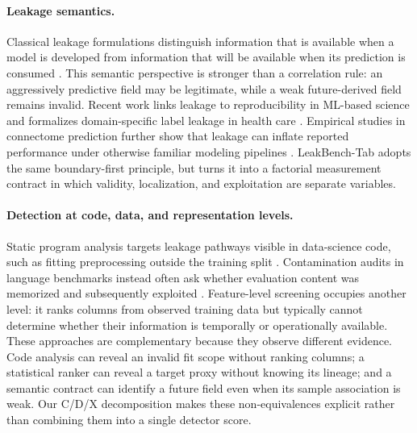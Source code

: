 \documentclass[sigconf,review]{acmart}
\begin{document}
\paragraph{Leakage semantics.}
Classical leakage formulations distinguish information that is available when
a model is developed from information that will be available when its
prediction is consumed \cite{kaufman2011leakage}. This semantic perspective is
stronger than a correlation rule: an aggressively predictive field may be
legitimate, while a weak future-derived field remains invalid. Recent work
links leakage to reproducibility in ML-based science \cite{kapoor2023leakage}
and formalizes domain-specific label leakage in health care
\cite{davis2024framework}. Empirical studies in connectome
prediction further show that leakage can inflate reported performance under
otherwise familiar modeling pipelines \cite{rosenblatt2024connectome}.
LeakBench-Tab adopts the same boundary-first principle, but turns it into a
factorial measurement contract in which validity, localization, and
exploitation are separate variables.

\paragraph{Detection at code, data, and representation levels.}
Static program analysis targets leakage pathways visible in data-science code,
such as fitting preprocessing outside the training split
\cite{subotic2022static}. Contamination audits in language benchmarks instead
often ask whether evaluation content was memorized and subsequently exploited
\cite{magar2022contamination}. Feature-level screening occupies another level:
it ranks columns from observed training data but typically cannot determine
whether their information is temporally or operationally available. These
approaches are complementary because they observe different evidence. Code
analysis can reveal an invalid fit scope without ranking columns; a statistical
ranker can reveal a target proxy without knowing its lineage; and a semantic
contract can identify a future field even when its sample association is weak.
Our C/D/X decomposition makes these non-equivalences explicit rather than
combining them into a single detector score.
\end{document}

